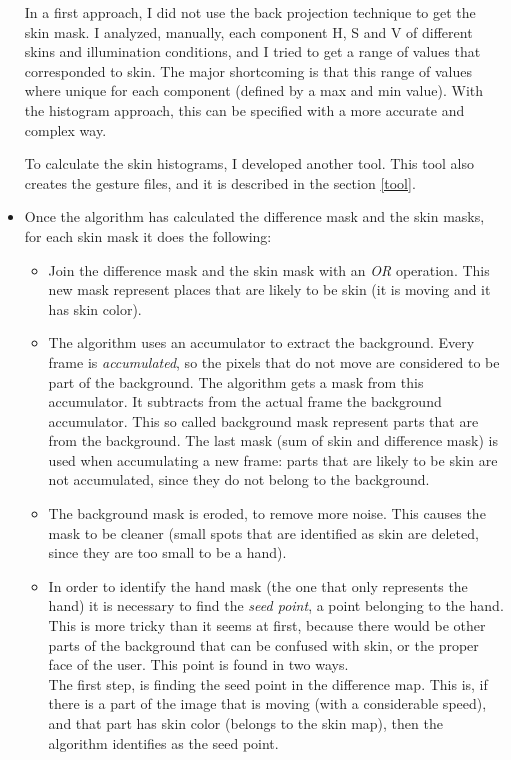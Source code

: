 \documentclass[11pt,a4paper]{article}
\begin{document}
\begin{itemize}
In a first approach, I did not use the back projection technique to get the skin mask. I analyzed, manually, each component H, S and V of different skins and illumination conditions, and I tried to get a range of values that corresponded to skin. The major shortcoming is that this range of values where unique for each component (defined by a max and min value). With the histogram approach, this can be specified with a more accurate and complex way.

To calculate the skin histograms, I developed another tool. This tool also creates the gesture files, and it is described in the section \ref{tool}.

\item Once the algorithm has calculated the difference mask and the skin masks, for each skin mask it does the following:
	\begin{itemize}
	\item Join the difference mask and the skin mask with an \textit{OR} operation. This new mask represent places that are likely to be skin (it is moving and it has skin color).

	\item The algorithm uses an accumulator to extract the background. Every frame is \textit{accumulated}, so the pixels that do not move are considered to be part of the background. The algorithm gets a mask from this accumulator. It subtracts from the actual frame the background accumulator. This so called background mask represent parts that are from the background. The last mask (sum of skin and difference mask) is used when accumulating a new frame: parts that are likely to be skin are not accumulated, since they do not belong to the background.
	
	\item The background mask is eroded, to remove more noise. This causes the mask to be cleaner (small spots that are identified as skin are deleted, since they are too small to be a hand).
	
	\item In order to identify the hand mask (the one that only represents the hand) it is necessary to find the \textit{seed point}, a point belonging to the hand. This is more tricky than it seems at first, because there would be other parts of the background that can be confused with skin, or the proper face of the user. This point is found in two ways.\\
	
	The first step, is finding the seed point in the difference map. This is, if there is a part of the image that is moving (with a considerable speed), and that part has skin color (belongs to the skin map), then the algorithm identifies as the seed point.\\
	

\end{itemize}
\end{itemize}
\end{document}
